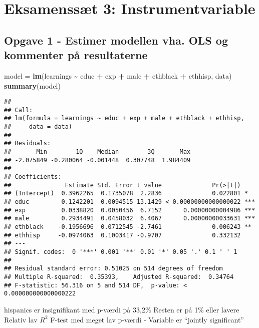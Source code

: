 \documentclass[
]{article}
\author{}
\date{\vspace{-2.5em}}
\newenvironment{Shaded}{\begin{snugshade}}{\end{snugshade}}
\newcommand{\FunctionTok}[1]{\textcolor[rgb]{0.13,0.29,0.53}{\textbf{#1}}}
\newcommand{\NormalTok}[1]{#1}
\newcommand{\OtherTok}[1]{\textcolor[rgb]{0.56,0.35,0.01}{#1}}
\newcommand{\SpecialCharTok}[1]{\textcolor[rgb]{0.81,0.36,0.00}{\textbf{#1}}}
\begin{document}
\hypertarget{eksamenssuxe6t-3-instrumentvariable}{%
\section{Eksamenssæt 3:
Instrumentvariable}\label{eksamenssuxe6t-3-instrumentvariable}}

\hypertarget{opgave-1---estimer-modellen-vha.-ols-og-kommenter-puxe5-resultaterne}{%
\subsection{Opgave 1 - Estimer modellen vha. OLS og kommenter på
resultaterne}\label{opgave-1---estimer-modellen-vha.-ols-og-kommenter-puxe5-resultaterne}}

\begin{Shaded}
\begin{Highlighting}[]
\NormalTok{model }\OtherTok{=} \FunctionTok{lm}\NormalTok{(learnings }\SpecialCharTok{\textasciitilde{}}\NormalTok{ educ }\SpecialCharTok{+}\NormalTok{ exp }\SpecialCharTok{+}\NormalTok{ male }\SpecialCharTok{+}\NormalTok{ ethblack }\SpecialCharTok{+}\NormalTok{ ethhisp, data)}
\FunctionTok{summary}\NormalTok{(model)}
\end{Highlighting}
\end{Shaded}

\begin{verbatim}
## 
## Call:
## lm(formula = learnings ~ educ + exp + male + ethblack + ethhisp, 
##     data = data)
## 
## Residuals:
##       Min        1Q    Median        3Q       Max 
## -2.075849 -0.280064 -0.001448  0.307748  1.984409 
## 
## Coefficients:
##               Estimate Std. Error t value              Pr(>|t|)    
## (Intercept)  0.3962265  0.1735078  2.2836              0.022801 *  
## educ         0.1242201  0.0094515 13.1429 < 0.00000000000000022 ***
## exp          0.0338820  0.0050456  6.7152      0.00000000004986 ***
## male         0.2934491  0.0458032  6.4067      0.00000000033631 ***
## ethblack    -0.1956696  0.0712545 -2.7461              0.006243 ** 
## ethhisp     -0.0974063  0.1003417 -0.9707              0.332132    
## ---
## Signif. codes:  0 '***' 0.001 '**' 0.01 '*' 0.05 '.' 0.1 ' ' 1
## 
## Residual standard error: 0.51025 on 514 degrees of freedom
## Multiple R-squared:  0.35393,    Adjusted R-squared:  0.34764 
## F-statistic: 56.316 on 5 and 514 DF,  p-value: < 0.000000000000000222
\end{verbatim}

hispanics er insignifikant med p-værdi på 33,2\% Resten er på 1\% eller
lavere Relativ lav \(R^2\) F-test med meget lav p-værdi - Variable er
``jointly significant''
\end{document}
